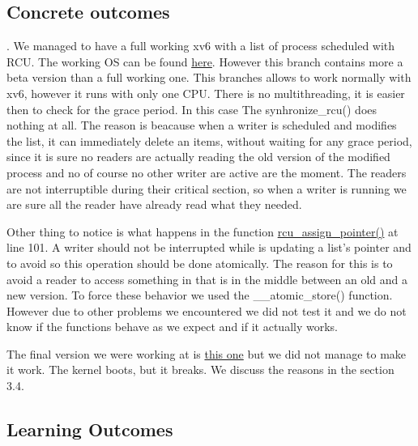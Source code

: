 \documentclass[10pt,a4]{article}
\begin{document}
\subsection{Concrete outcomes}
.
We managed to have a full working xv6 with a list of process scheduled with RCU. The working OS can be found \href{inserire.link.parent.handling}{here}. However this branch contains more a beta version than a full working one. This branches allows to work normally with xv6, however it runs with only one CPU. There is no multithreading, it is easier then to check for the grace period. In this case The synhronize\_rcu() does nothing at all. The reason is beacause when a writer is scheduled and modifies the list, it can immediately delete an items, without waiting for any grace period, since it is sure no readers are actually reading the old version of the modified process and no of course no other writer are active are the moment. The readers are not interruptible during their critical section, so when a writer is running we are sure all the reader have already read what they needed.

Other thing to notice is what happens in the function \href{}{rcu\_assign\_pointer()} at line 101. A writer should not be interrupted while is updating a list's pointer and to avoid so this operation should be done atomically. The reason for this is to avoid a reader to access something in that is in the middle between an old and a new version. To force these behavior we used the \_\_atomic\_store() function. However due to other problems we encountered we did not test it and we do not know if the functions behave as we expect and if it actually works.


The final version we were working at is \href{inserire link alla final version}{this one} but we did not manage to make it work. The kernel boots, but it breaks. We discuss the reasons in the section 3.4.


\subsection{Learning Outcomes}
\end{document}
